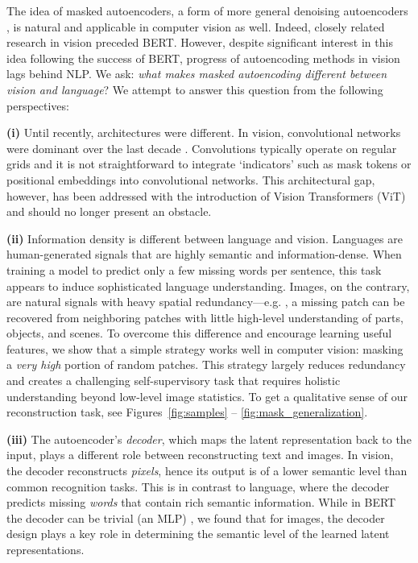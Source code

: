 The idea of masked autoencoders, a form of more general denoising autoencoders \cite{Vincent2008}, is natural and applicable in computer vision as well. Indeed, closely related research in vision \cite{Vincent2010,Pathak2016} preceded BERT. However, despite significant interest in this idea following the success of BERT, progress of autoencoding methods in vision lags behind NLP. We ask: \textit{what makes masked autoencoding different between vision and language}? We attempt to answer this question from the following perspectives:

\textbf{(i)} Until recently, architectures were different. In vision, convolutional networks \cite{LeCun1989} were dominant over the last decade \cite{Krizhevsky2012}. Convolutions typically operate on regular grids and it is not straightforward to integrate `indicators' such as mask tokens \cite{Devlin2019} or positional embeddings \cite{Vaswani2017} into convolutional networks. This architectural gap, however, has been addressed with the introduction of Vision Transformers (ViT) \cite{Dosovitskiy2021} and should no longer present an obstacle.

\textbf{(ii)} Information density is different between language and vision. Languages are human-generated signals that are highly semantic and information-dense. When training a model to predict only a few missing words per sentence, this task appears to induce sophisticated language understanding. Images, on the contrary, are natural signals with heavy spatial redundancy---e.g. , a missing patch can be recovered from neighboring patches with little high-level understanding of parts, objects, and scenes. To overcome this difference and encourage learning useful features, we show that a simple strategy works well in computer vision: masking a \textit{very high} portion of random patches. This strategy largely reduces redundancy and creates a challenging self-supervisory task that requires holistic understanding beyond low-level image statistics. To get a qualitative sense of our reconstruction task, see Figures~\ref{fig:samples} -- \ref{fig:mask_generalization}.

\textbf{(iii)} The autoencoder's \textit{decoder}, which maps the latent representation back to the input, plays a different role between reconstructing text and images. In vision, the decoder reconstructs \emph{pixels}, hence its output is of a lower \mbox{semantic} level than common recognition tasks. This is in contrast to language, where the decoder predicts missing \emph{words} that contain rich semantic information. While in BERT the decoder can be trivial (an MLP) \cite{Devlin2019}, we found that for images, the decoder design plays a key role in determining the semantic level of the learned latent representations.

